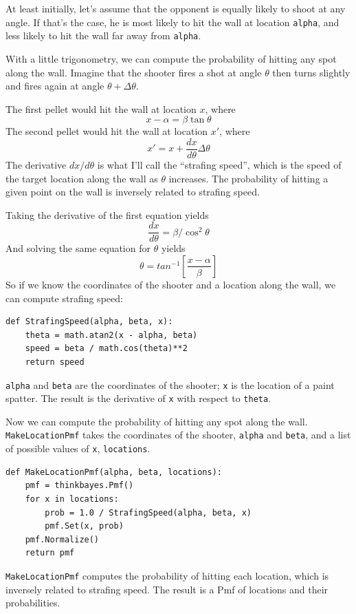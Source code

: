 \documentclass[12pt]{book}
\begin{document}
At least initially, let's assume that the opponent is equally likely
to shoot at any angle.  If that's the case, he is most likely to hit
the wall at location {\tt alpha}, and less likely to hit the wall far
away from {\tt alpha}.

With a little trigonometry, we can compute the probability of hitting
any spot along the wall.  Imagine that the shooter fires a shot at
angle $\theta$ then turns slightly and fires again at angle $\theta +
\Delta\theta$.

The first pellet would hit the wall at location $x$, where
%
\[ x - \alpha = \beta \tan \theta \]
%
The second pellet would hit the wall at location $x'$, where
%
\[ x' = x + \frac{dx}{d\theta} \Delta\theta \]
%
The derivative $dx/d\theta$ is what I'll call the ``strafing speed'',
which is the speed of the target location along the wall as $\theta$
increases.  The probability of hitting a given point on the wall is
inversely related to strafing speed.

Taking the derivative of the first equation yields
%
\[ \frac{dx}{d\theta} = \beta / \cos^2 \theta \]
%
And solving the same equation for $\theta$ yields
%
\[ \theta = tan^{-1} \left[ \frac{x - \alpha}{\beta} \right] \]
%
So if we know the coordinates of the shooter and a location 
along the wall, we can compute strafing speed:

\begin{verbatim}
def StrafingSpeed(alpha, beta, x):
    theta = math.atan2(x - alpha, beta)
    speed = beta / math.cos(theta)**2
    return speed
\end{verbatim}

{\tt alpha} and {\tt beta} are the coordinates of the shooter;
{\tt x} is the location of a paint spatter.  The result is
the derivative of {\tt x} with respect to {\tt theta}.

Now we can compute the probability of hitting any spot along
the wall.  {\tt MakeLocationPmf} takes the coordinates of
the shooter, {\tt alpha} and {\tt beta}, and a list of possible
values of {\tt x}, {\tt locations}.

\begin{verbatim}
def MakeLocationPmf(alpha, beta, locations):
    pmf = thinkbayes.Pmf()
    for x in locations:
        prob = 1.0 / StrafingSpeed(alpha, beta, x)
        pmf.Set(x, prob)
    pmf.Normalize()
    return pmf
\end{verbatim}

{\tt MakeLocationPmf} computes the probability of hitting
each location, which is inversely related to
strafing speed.  The result is a Pmf of locations and their
probabilities.
\end{document}
